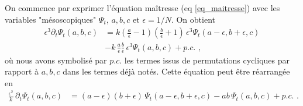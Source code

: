 \documentclass[openany,a4paper,12pt]{article}
\begin{document}
\par On commence par exprimer l'équation maîtresse (eq \ref{eq_maitresse}) avec les variables "mésoscopiques" $\Psi_t$, $a,b,c$ et $\epsilon=1/N$. On obtient
%
\begin{equation}\label{eq_maitresse_minuscules}
\begin{split}
	\epsilon ^3 \partial_t \Psi_t(a,b,c) 
	&= k \left( \frac a \epsilon - 1 \right) \left( \frac b \epsilon + 1\right)  \, \epsilon^3 \Psi_t(a-\epsilon, b+\epsilon, c) \\
	&- k\, \frac a \epsilon \frac b \epsilon \, \epsilon^3 \Psi_t(a,b,c) + p.c. \,\, ,
\end{split}
\end{equation}
%
où nous avons symbolisé par $p.c.$ les termes issus de permutations cycliques par rapport à $a,b,c$ dans les termes déjà notés. Cette équation peut être réarrangée en
%
\begin{equation}\label{eq_maitresse_minuscules_clean}
\begin{split}
	\frac{\epsilon^2}{k}\, \partial_t \Psi_t(a,b,c) 
	&= (a-\epsilon)(b+\epsilon)  \, \Psi_t(a-\epsilon, b+\epsilon, c) 
	- ab \, \Psi_t(a,b,c) + p.c. \,\, .
\end{split}
\end{equation}
%
\end{document}
